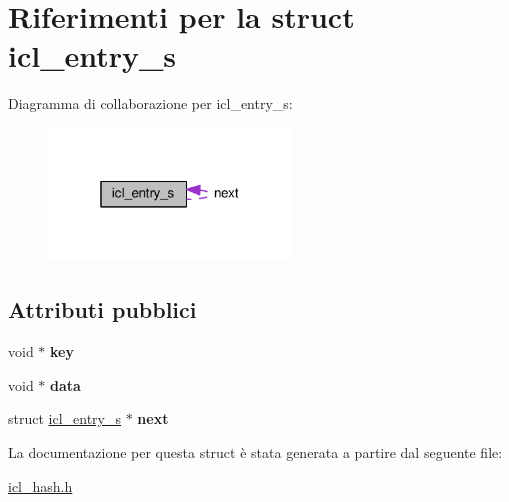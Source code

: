 \hypertarget{structicl__entry__s}{}\section{Riferimenti per la struct icl\+\_\+entry\+\_\+s}
\label{structicl__entry__s}


Diagramma di collaborazione per icl\+\_\+entry\+\_\+s\+:
\nopagebreak
\begin{figure}[H]
\begin{center}
\leavevmode
\includegraphics[width=184pt]{structicl__entry__s__coll__graph}
\end{center}
\end{figure}
\subsection*{Attributi pubblici}
\begin{DoxyCompactItemize}
\item 
void $\ast$ {\bfseries key}\hypertarget{structicl__entry__s_a175ddfefe49a8f6fa16155e58c39c88e}{}\label{structicl__entry__s_a175ddfefe49a8f6fa16155e58c39c88e}

\item 
void $\ast$ {\bfseries data}\hypertarget{structicl__entry__s_ac01964f2d85fcdbaa2d16c78fb1a99d6}{}\label{structicl__entry__s_ac01964f2d85fcdbaa2d16c78fb1a99d6}

\item 
struct \hyperlink{structicl__entry__s}{icl\+\_\+entry\+\_\+s} $\ast$ {\bfseries next}\hypertarget{structicl__entry__s_af5bc67953f51e75cf74066d616f3420c}{}\label{structicl__entry__s_af5bc67953f51e75cf74066d616f3420c}

\end{DoxyCompactItemize}


La documentazione per questa struct è stata generata a partire dal seguente file\+:\begin{DoxyCompactItemize}
\item 
\hyperlink{icl__hash_8h}{icl\+\_\+hash.\+h}\end{DoxyCompactItemize}
